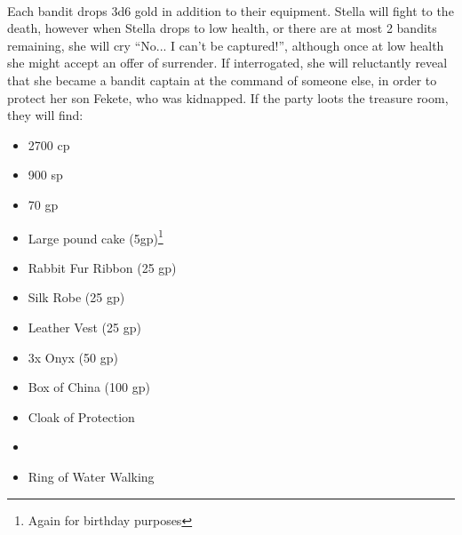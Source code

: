 \\
Each bandit drops 3d6 gold in addition to their equipment. Stella will fight to the death, however when Stella drops to low health, or there are at most 2 bandits remaining, she will cry ``No... I can't be captured!'', although once at low health she might accept an offer of surrender. If interrogated, she will reluctantly reveal that she became a bandit captain at the command of someone else, in order to protect her son Fekete, who was kidnapped. If the party loots the treasure room, they will find:
\begin{itemize}
\item 2700 cp
\item 900 sp
\item 70 gp
\item Large pound cake (5gp)\footnote{Again for birthday purposes}
\item Rabbit Fur Ribbon (25 gp)
\item Silk Robe (25 gp)
\item Leather Vest (25 gp)
\item 3x Onyx (50 gp)
\item Box of China (100 gp)
\item Cloak of Protection
\item {}
\item Ring of Water Walking
\end{itemize}

